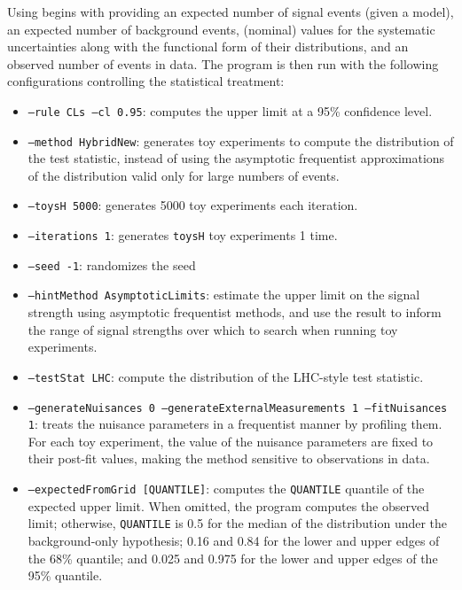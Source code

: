 Using \combine begins with providing an expected number of signal events (given a model), an expected number of background events, (nominal) values for the systematic uncertainties along with the functional form of their distributions, and an observed number of events in data.
The \combine program is then run with the following configurations controlling the statistical treatment:
\pagebreak
\begin{itemize}
  \item \texttt{--rule CLs --cl 0.95}: computes the \CLs upper limit at a 95\% confidence level.
  \item \texttt{--method HybridNew}: generates toy experiments to compute the distribution of the test statistic, instead of using the asymptotic frequentist approximations of the distribution valid only for large numbers of events.
  \item \texttt{--toysH 5000}: generates 5000 toy experiments each iteration.
  \item \texttt{--iterations 1}: generates \texttt{toysH} toy experiments 1 time.
  \item \texttt{--seed -1}: randomizes the seed
  \item \texttt{--hintMethod AsymptoticLimits}: estimate the upper limit on the signal strength using asymptotic frequentist methods, and use the result to inform the range of signal strengths over which to search when running toy experiments.
  \item \texttt{--testStat LHC}: compute the distribution of the LHC-style test statistic.
  \item \texttt{--generateNuisances 0 --generateExternalMeasurements 1 --fitNuisances 1}: treats the nuisance parameters in a frequentist manner by profiling them. For each toy experiment, the value of the nuisance parameters are fixed to their post-fit values, making the method sensitive to observations in data.
  \item \texttt{--expectedFromGrid [QUANTILE]}: computes the \texttt{QUANTILE} quantile of the expected upper limit. When omitted, the program computes the observed limit; otherwise, \texttt{QUANTILE} is 0.5 for the median of the distribution under the background-only hypothesis; 0.16 and 0.84 for the lower and upper edges of the 68\% quantile; and 0.025 and 0.975 for the lower and upper edges of the 95\% quantile. 
\end{itemize}

